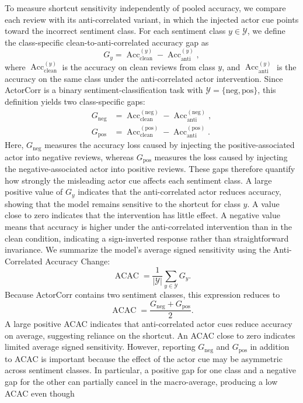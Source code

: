 \documentclass[11pt]{article}
\theoremstyle{definition}
\theoremstyle{plain}
\begin{document}
To measure shortcut sensitivity independently of pooled accuracy, we compare each review with its anti-correlated variant, in which the injected actor cue points toward the incorrect sentiment class. For each sentiment class $y\in\mathcal{Y}$, we define the class-specific clean-to-anti-correlated accuracy gap as \begin{equation} G_y = \operatorname{Acc}_{\mathrm{clean}}^{(y)} - \operatorname{Acc}_{\mathrm{anti}}^{(y)}, \label{eq:actorcorr-class-gap} \end{equation} where $\operatorname{Acc}_{\mathrm{clean}}^{(y)}$ is the accuracy on clean reviews from class $y$, and $\operatorname{Acc}_{\mathrm{anti}}^{(y)}$ is the accuracy on the same class under the anti-correlated actor intervention. Since ActorCorr is a binary sentiment-classification task with $\mathcal{Y}=\{\mathrm{neg},\mathrm{pos}\}$, this definition yields two class-specific gaps: \begin{align} G_{\mathrm{neg}} &= \operatorname{Acc}_{\mathrm{clean}}^{(\mathrm{neg})} - \operatorname{Acc}_{\mathrm{anti}}^{(\mathrm{neg})}, \label{eq:actorcorr-gap-neg} \\ G_{\mathrm{pos}} &= \operatorname{Acc}_{\mathrm{clean}}^{(\mathrm{pos})} - \operatorname{Acc}_{\mathrm{anti}}^{(\mathrm{pos})}. \label{eq:actorcorr-gap-pos} \end{align} Here, $G_{\mathrm{neg}}$ measures the accuracy loss caused by injecting the positive-associated actor into negative reviews, whereas $G_{\mathrm{pos}}$ measures the loss caused by injecting the negative-associated actor into positive reviews. These gaps therefore quantify how strongly the misleading actor cue affects each sentiment class. A large positive value of $G_y$ indicates that the anti-correlated actor reduces accuracy, showing that the model remains sensitive to the shortcut for class $y$. A value close to zero indicates that the intervention has little effect. A negative value means that accuracy is higher under the anti-correlated intervention than in the clean condition, indicating a sign-inverted response rather than straightforward invariance. We summarize the model's average signed sensitivity using the Anti-Correlated Accuracy Change: \begin{equation} \operatorname{ACAC} = \frac{1}{|\mathcal{Y}|} \sum_{y\in\mathcal{Y}}G_y. \label{eq:actorcorr-acac-app} \end{equation} Because ActorCorr contains two sentiment classes, this expression reduces to \begin{equation} \operatorname{ACAC} = \frac{ G_{\mathrm{neg}}+G_{\mathrm{pos}} }{2}. \label{eq:actorcorr-acac-binary} \end{equation} A large positive ACAC indicates that anti-correlated actor cues reduce accuracy on average, suggesting reliance on the shortcut. An ACAC close to zero indicates limited average signed sensitivity. However, reporting $G_{\mathrm{neg}}$ and $G_{\mathrm{pos}}$ in addition to ACAC is important because the effect of the actor cue may be asymmetric across sentiment classes. In particular, a positive gap for one class and a negative gap for the other can partially cancel in the macro-average, producing a low ACAC even though 
\end{document}
